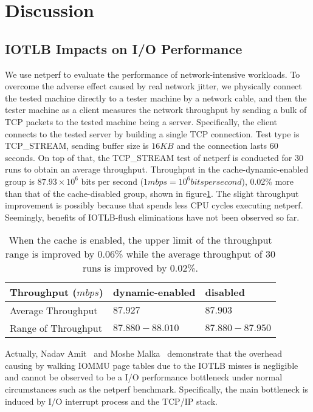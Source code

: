 \section{\name Discussion} \label{sec:dis}
\subsection{IOTLB Impacts on I/O Performance}

We use netperf to evaluate the performance of network-intensive workloads. To overcome the adverse effect caused by real network jitter, we physically connect the tested machine directly to a tester machine by a network cable, and then the tester machine as a client measures the network throughput by sending a bulk of TCP packets to the tested machine being a server. Specifically, the client connects to the tested server by building a single TCP connection. Test type is TCP\_STREAM, sending buffer size is $16KB$ and the connection lasts $60$ seconds. On top of that, the TCP\_STREAM test of netperf is conducted for $30$ runs to obtain an average throughput. Throughput in the cache-dynamic-enabled group is $87.93 \times 10^6$ bits per second ($1 mbps = 10^6 bits per second$), 0.02\% more than that of the cache-disabled group, shown in figure\ref{tab:netperf}. The slight throughput improvement is possibly because that \name spends less CPU cycles executing netperf. Seemingly, benefits of IOTLB-flush eliminations have not been observed so far.

\begin{table}[!ht]
\footnotesize
\begin{center}
\begin{tabular}{|l|l|l|}
\hline
{\textbf{Throughput ($mbps$)}} & {\textbf{dynamic-enabled}} & {\textbf{disabled}}    \\ \hline
Average Throughput &  $87.927$ & $87.903$ \\ \hline
Range of Throughput & $87.880-88.010$ & $87.880-87.950$ \\ \hline
\end{tabular}
\end{center}
\caption{When the cache is enabled, the upper limit of the throughput range is improved by 0.06\% while the average throughput of 30 runs is improved by 0.02\%. }
\label{tab:netperf}
\end{table}

Actually, Nadav Amit~\cite{amit2012iommu} and Moshe Malka~\cite{malka2015riommu} demonstrate that the overhead causing by walking IOMMU page tables due to the IOTLB misses is negligible and cannot be observed to be a I/O performance bottleneck under normal circumstances such as the netperf benchmark. Specifically, the main bottleneck is induced by I/O interrupt process and the TCP/IP stack.

